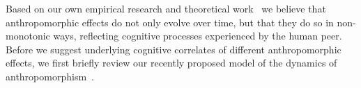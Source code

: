 \documentclass{sig-alternate-2013}
\begin{document}

Based on our own empirical research and theoretical work~\cite{fink_anthropomorphism_2012, fink_living_2013, fink2014which} 
we believe that anthropomorphic effects do not
only evolve over time, but that they do so in non-monotonic ways, reflecting
cognitive processes experienced by the human peer. Before we suggest underlying cognitive correlates of different anthropomorphic effects, we first briefly review our recently proposed model of the dynamics of anthropomorphism~\cite{lemaignan2014dynamics}.
 
\end{document}
